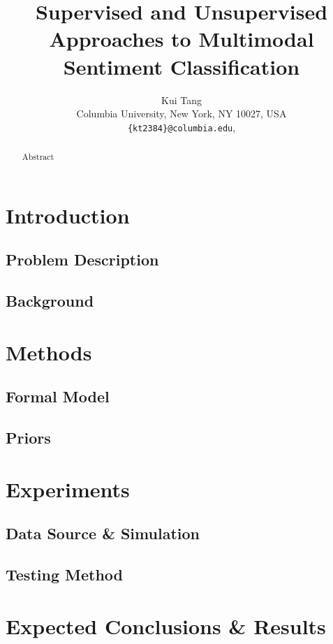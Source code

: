 \documentclass{article}
\title{Supervised and Unsupervised Approaches to Multimodal Sentiment Classification}
\author{
Kui Tang\\
Columbia University, New York, NY 10027, USA\\
\texttt{\{kt2384\}@columbia.edu},
}
\begin{document}
\maketitle

\begin{abstract}
Abstract
\end{abstract}

\section{Introduction}
\label{sec:introduction}

\citep{lin03}
\subsection{Problem Description}

\subsection{Background}

\section{Methods}

\subsection{Formal Model}
\subsection{Priors}

\section{Experiments}

\subsection{Data Source \& Simulation}


\subsection{Testing Method}


\section{Expected Conclusions \& Results}

\begin{small}

 
\end{small}
\end{document}
